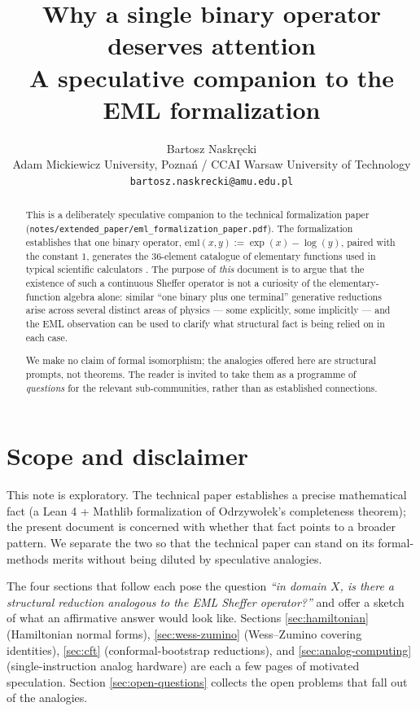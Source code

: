 \documentclass[11pt,a4paper]{article}
\title{Why a single binary operator deserves attention\\[3pt]
       \large A speculative companion to the EML formalization}
\author{Bartosz Naskręcki\\[2pt]
  \small Adam Mickiewicz University, Poznań / CCAI Warsaw University of Technology\\
  \small \texttt{bartosz.naskrecki@amu.edu.pl}}
\date{}
\newcommand{\eml}{\mathrm{eml}}
\begin{document}
\maketitle

\begin{abstract}
This is a deliberately speculative companion to the technical
formalization paper
(\texttt{notes/extended\_paper/eml\_formalization\_paper.pdf}). The
formalization establishes that one binary operator,
$\eml(x, y) := \exp(x) - \log(y)$, paired with the constant $1$,
generates the $36$-element catalogue of elementary functions used in
typical scientific calculators
\cite{odrzywolek2026eml}. The purpose of \emph{this} document is
to argue that the existence of such a continuous Sheffer operator is
not a curiosity of the elementary-function algebra alone: similar
``one binary plus one terminal'' generative reductions arise across
several distinct areas of physics --- some explicitly, some
implicitly --- and the EML observation can be used to clarify what
structural fact is being relied on in each case.

We make no claim of formal isomorphism; the analogies offered here
are structural prompts, not theorems. The reader is invited to take
them as a programme of \emph{questions} for the relevant
sub-communities, rather than as established connections.
\end{abstract}

\tableofcontents

\section{Scope and disclaimer}
\label{sec:scope}

This note is exploratory. The technical paper
\cite{naskrecki2026formalization} establishes a precise mathematical
fact (a Lean 4 + Mathlib formalization of Odrzywołek's completeness
theorem); the present document is concerned with whether that fact
points to a broader pattern. We separate the two so that the
technical paper can stand on its formal-methods merits without being
diluted by speculative analogies.

The four sections that follow each pose the question \emph{``in
domain $X$, is there a structural reduction analogous to the EML
Sheffer operator?''} and offer a sketch of what an affirmative
answer would look like. Sections \ref{sec:hamiltonian} (Hamiltonian
normal forms), \ref{sec:wess-zumino} (Wess--Zumino covering
identities), \ref{sec:cft} (conformal-bootstrap reductions), and
\ref{sec:analog-computing} (single-instruction analog hardware) are
each a few pages of motivated speculation. Section
\ref{sec:open-questions} collects the open problems that fall out
of the analogies.
\end{document}
